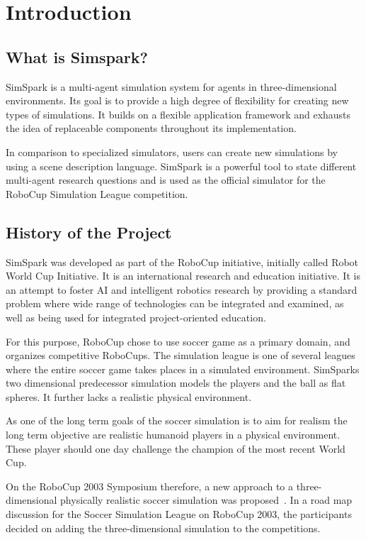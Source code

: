 \chapter{Introduction}

\section{What is Simspark?}

SimSpark is a multi-agent simulation system for agents in
three-dimensional environments. Its goal is to provide a high degree
of flexibility for creating new types of simulations. It builds on a
flexible application framework and exhausts the idea of replaceable
components throughout its implementation.

In comparison to specialized simulators, users can create new
simulations by using a scene description language. SimSpark is a
powerful tool to state different multi-agent research questions and is
used as the official simulator for the RoboCup Simulation League
competition.

\section{History of the Project}

SimSpark was developed as part of the RoboCup initiative, initially
called Robot World Cup Initiative. It is an international research and
education initiative. It is an attempt to foster AI and intelligent
robotics research by providing a standard problem where wide range of
technologies can be integrated and examined, as well as being used for
integrated project-oriented education.

For this purpose, RoboCup chose to use soccer game as a primary
domain, and organizes competitive RoboCups. The simulation league is
one of several leagues where the entire soccer game takes places in a
simulated environment. SimSparks two dimensional predecessor
simulation models the players and the ball as flat spheres. It further
lacks a realistic physical environment.

As one of the long term goals of the soccer simulation is to aim for
realism the long term objective are realistic humanoid players in a
physical environment. These player should one day challenge the
champion of the most recent World Cup.

On the RoboCup 2003 Symposium therefore, a new approach to a
three-dimensional physically realistic soccer simulation was
proposed~\cite{KO04}. In a road map discussion for the Soccer Simulation League on
RoboCup 2003, the participants decided on adding the three-dimensional
simulation to the competitions.

